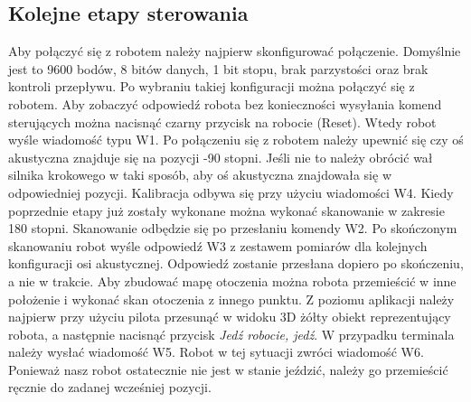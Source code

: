 \documentclass[a4paper]{article}
\begin{document}
\subsection{Kolejne etapy sterowania}
Aby połączyć się z robotem należy najpierw skonfigurować połączenie. Domyślnie jest to 9600 bodów, 8 bitów danych, 1 bit stopu, brak parzystości oraz brak kontroli przepływu. Po wybraniu takiej konfiguracji można połączyć się z robotem. Aby zobaczyć odpowiedź robota bez konieczności wysyłania komend sterujących można nacisnąć czarny przycisk na robocie (Reset). Wtedy robot wyśle wiadomość typu W1. \newline
Po połączeniu się z robotem należy upewnić się czy oś akustyczna znajduje się na pozycji -90 stopni. Jeśli nie to należy obrócić wał silnika krokowego w taki sposób, aby oś akustyczna znajdowała się w odpowiedniej pozycji. Kalibracja odbywa się przy użyciu wiadomości W4. \newline
Kiedy poprzednie etapy już zostały wykonane można wykonać skanowanie w zakresie 180 stopni. Skanowanie odbędzie się po przesłaniu komendy W2. Po skończonym skanowaniu robot wyśle odpowiedź W3 z zestawem pomiarów dla kolejnych konfiguracji osi akustycznej. Odpowiedź zostanie przesłana dopiero po skończeniu, a nie w trakcie. \newline
Aby zbudować mapę otoczenia można robota przemieścić w inne położenie i wykonać skan otoczenia z innego punktu. Z poziomu aplikacji należy najpierw przy użyciu pilota przesunąć w widoku 3D żółty obiekt reprezentujący robota, a następnie nacisnąć przycisk \textit{Jedź robocie, jedź}. W przypadku terminala należy wysłać wiadomość 
W5. Robot w tej sytuacji zwróci wiadomość W6. \newline
Ponieważ nasz robot ostatecznie nie jest w stanie jeździć, należy go przemieścić ręcznie do zadanej wcześniej pozycji. 
\end{document}
